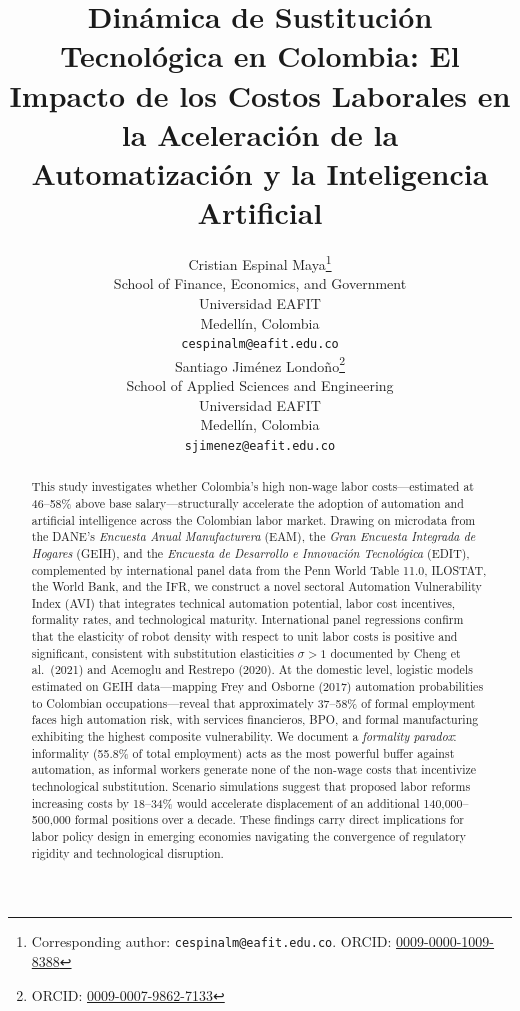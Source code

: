 \documentclass{article}
\title{Din\'amica de Sustituci\'on Tecnol\'ogica en Colombia: El Impacto de los Costos Laborales en la Aceleraci\'on de la Automatizaci\'on y la Inteligencia Artificial}
\author{
 Cristian Espinal Maya\thanks{Corresponding author: \texttt{cespinalm@eafit.edu.co}. ORCID: \href{https://orcid.org/0009-0000-1009-8388}{0009-0000-1009-8388}} \\
  School of Finance, Economics, and Government\\
  Universidad EAFIT\\
  Medell\'in, Colombia \\
  \texttt{cespinalm@eafit.edu.co} \\
  \And
 Santiago Jim\'enez Londo\~no\thanks{ORCID: \href{https://orcid.org/0009-0007-9862-7133}{0009-0007-9862-7133}} \\
  School of Applied Sciences and Engineering\\
  Universidad EAFIT\\
  Medell\'in, Colombia \\
  \texttt{sjimenez@eafit.edu.co} \\
}
\begin{document}
\maketitle

\begin{abstract}
This study investigates whether Colombia's high non-wage labor costs---estimated at 46--58\% above base salary---structurally accelerate the adoption of automation and artificial intelligence across the Colombian labor market. Drawing on microdata from the DANE's \textit{Encuesta Anual Manufacturera} (EAM), the \textit{Gran Encuesta Integrada de Hogares} (GEIH), and the \textit{Encuesta de Desarrollo e Innovaci\'on Tecnol\'ogica} (EDIT), complemented by international panel data from the Penn World Table 11.0, ILOSTAT, the World Bank, and the IFR, we construct a novel sectoral Automation Vulnerability Index (AVI) that integrates technical automation potential, labor cost incentives, formality rates, and technological maturity. International panel regressions confirm that the elasticity of robot density with respect to unit labor costs is positive and significant, consistent with substitution elasticities $\sigma > 1$ documented by Cheng et al.\ (2021) and Acemoglu and Restrepo (2020). At the domestic level, logistic models estimated on GEIH data---mapping Frey and Osborne (2017) automation probabilities to Colombian occupations---reveal that approximately 37--58\% of formal employment faces high automation risk, with services financieros, BPO, and formal manufacturing exhibiting the highest composite vulnerability. We document a \textit{formality paradox}: informality (55.8\% of total employment) acts as the most powerful buffer against automation, as informal workers generate none of the non-wage costs that incentivize technological substitution. Scenario simulations suggest that proposed labor reforms increasing costs by 18--34\% would accelerate displacement of an additional 140,000--500,000 formal positions over a decade. These findings carry direct implications for labor policy design in emerging economies navigating the convergence of regulatory rigidity and technological disruption.
\end{abstract}





\end{document}
